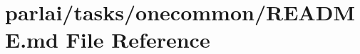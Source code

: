 \hypertarget{parlai_2tasks_2onecommon_2README_8md}{}\section{parlai/tasks/onecommon/\+R\+E\+A\+D\+ME.md File Reference}
\label{parlai_2tasks_2onecommon_2README_8md}
